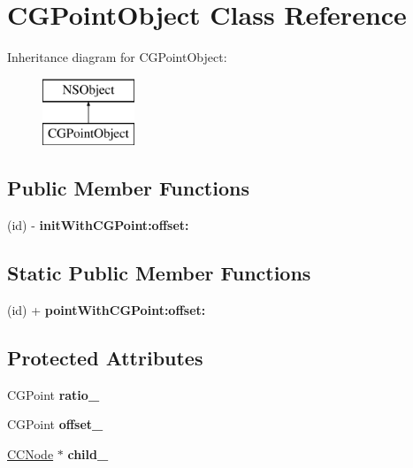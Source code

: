 \hypertarget{interface_c_g_point_object}{\section{C\-G\-Point\-Object Class Reference}
\label{interface_c_g_point_object}
}
Inheritance diagram for C\-G\-Point\-Object\-:\begin{figure}[H]
\begin{center}
\leavevmode
\includegraphics[height=2.000000cm]{interface_c_g_point_object}
\end{center}
\end{figure}
\subsection*{Public Member Functions}
\begin{DoxyCompactItemize}
\item 
\hypertarget{interface_c_g_point_object_a9a975d23275454b7bef9157ad30b2191}{(id) -\/ {\bfseries init\-With\-C\-G\-Point\-:offset\-:}}\label{interface_c_g_point_object_a9a975d23275454b7bef9157ad30b2191}

\end{DoxyCompactItemize}
\subsection*{Static Public Member Functions}
\begin{DoxyCompactItemize}
\item 
\hypertarget{interface_c_g_point_object_afc5223efc913fddd3f8f9460417f5cf2}{(id) + {\bfseries point\-With\-C\-G\-Point\-:offset\-:}}\label{interface_c_g_point_object_afc5223efc913fddd3f8f9460417f5cf2}

\end{DoxyCompactItemize}
\subsection*{Protected Attributes}
\begin{DoxyCompactItemize}
\item 
\hypertarget{interface_c_g_point_object_a6fca7e2f7e1c6ef462e9bb238b0c4080}{C\-G\-Point {\bfseries ratio\-\_\-}}\label{interface_c_g_point_object_a6fca7e2f7e1c6ef462e9bb238b0c4080}

\item 
\hypertarget{interface_c_g_point_object_a24d86214399b0c9475732c8970933a97}{C\-G\-Point {\bfseries offset\-\_\-}}\label{interface_c_g_point_object_a24d86214399b0c9475732c8970933a97}

\item 
\hypertarget{interface_c_g_point_object_a7d92189005ae27d8a918d8cc118f7c7d}{\hyperlink{class_c_c_node}{C\-C\-Node} $\ast$ {\bfseries child\-\_\-}}\label{interface_c_g_point_object_a7d92189005ae27d8a918d8cc118f7c7d}

\end{DoxyCompactItemize}
